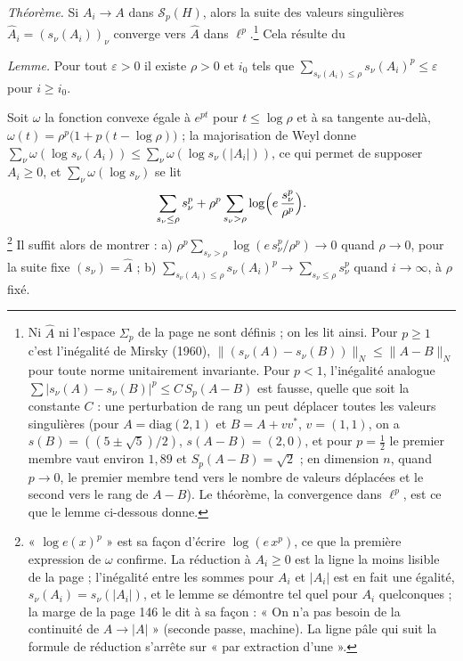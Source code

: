 \documentclass[11pt,a4paper]{article}
\begin{document}
\emph{Théorème.} Si $A_i \to A$ dans $\mathcal{S}_p(H)$, alors la suite des
valeurs singulières $\hat{A}_i = (s_\nu(A_i))_\nu$ converge vers $\hat{A}$
dans $\ell^p$.\footnote{Ni $\hat{A}$ ni l'espace $\Sigma_p$ de la page ne
sont définis ; on les lit ainsi. Pour $p \geq 1$ c'est l'inégalité de
Mirsky (1960), $\|(s_\nu(A) - s_\nu(B))\|_N \leq \|A - B\|_N$ pour toute
norme unitairement invariante. Pour $p < 1$, l'inégalité analogue $\sum
|s_\nu(A) - s_\nu(B)|^p \leq C\,S_p(A - B)$ est fausse, quelle que soit la
constante $C$ : une perturbation de rang un peut déplacer toutes les valeurs
singulières (pour $A = \mathrm{diag}(2,1)$ et $B = A + vv^{*}$, $v = (1,1)$,
on a $s(B) = ((5 \pm \sqrt5)/2)$, $s(A - B) = (2, 0)$, et pour $p = \frac12$
le premier membre vaut environ $1{,}89$ et $S_p(A - B) = \sqrt2$ ; en
dimension $n$, quand $p \to 0$, le premier membre tend vers le nombre de
valeurs déplacées et le second vers le rang de $A - B$). Le théorème, la
convergence dans $\ell^p$, est ce que le lemme ci-dessous donne.} Cela résulte du

\emph{Lemme.} Pour tout $\varepsilon > 0$ il existe $\rho > 0$ et $i_0$ tels
que $\sum_{s_\nu(A_i) \leq \rho} s_\nu(A_i)^p \leq \varepsilon$ pour $i \geq
i_0$.

Soit $\omega$ la fonction convexe égale à $e^{pt}$ pour $t \leq \log\rho$ et
à sa tangente au-delà, $\omega(t) = \rho^p\bigl(1 + p(t - \log\rho)\bigr)$ ;
la majorisation de Weyl donne $\sum_\nu \omega(\log s_\nu(A_i)) \leq \sum_\nu
\omega(\log s_\nu(|A_i|))$, ce qui permet de supposer $A_i \geq 0$, et
$\sum_\nu \omega(\log s_\nu)$ se lit
\[
  \sum_{s_\nu \leq \rho} s_\nu^p + \rho^p\sum_{s_\nu > \rho} \log\Bigl(e\,\frac{s_\nu^p}{\rho^p}\Bigr) .
\]
\footnote{« $\log e(x)^p$ » est sa façon d'écrire $\log(e\,x^p)$, ce que la
première expression de $\omega$ confirme. La réduction à $A_i \geq 0$ est
la ligne la moins lisible de la page ; l'inégalité entre les sommes pour
$A_i$ et $|A_i|$ est en fait une égalité, $s_\nu(A_i) = s_\nu(|A_i|)$, et le
lemme se démontre tel quel pour $A_i$ quelconques ; la marge de la page 146
le dit à sa façon : « On n'a pas besoin de la continuité de $A \to |A|$ »
(seconde passe, machine). La ligne pâle qui suit la formule de réduction
s'arrête sur « par extraction d'une ».} Il suffit alors de
montrer :
a) $\rho^p\sum_{s_\nu > \rho} \log(e\,s_\nu^p/\rho^p) \to 0$ quand $\rho \to 0$,
pour la suite fixe $(s_\nu) = \hat{A}$ ; b) $\sum_{s_\nu(A_i) \leq \rho}
s_\nu(A_i)^p \to \sum_{s_\nu \leq \rho} s_\nu^p$ quand $i \to \infty$, à $\rho$
fixé.
\end{document}
